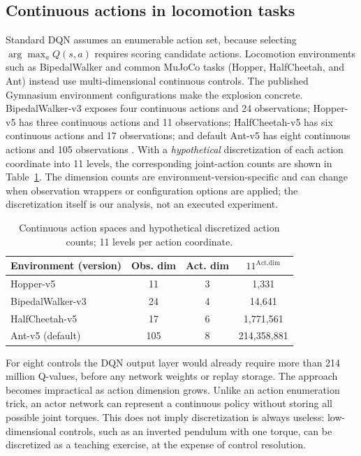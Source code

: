 \documentclass[conference,10pt]{IEEEtran}
\begin{document}
\subsection{Continuous actions in locomotion tasks}
Standard DQN assumes an enumerable action set, because selecting $\arg\max_a Q(s,a)$ requires scoring candidate actions. Locomotion environments such as BipedalWalker and common MuJoCo tasks (Hopper, HalfCheetah, and Ant) instead use multi-dimensional continuous controls. The published Gymnasium environment configurations make the explosion concrete. BipedalWalker-v3 exposes four continuous actions and 24 observations; Hopper-v5 has three continuous actions and 11 observations; HalfCheetah-v5 has six continuous actions and 17 observations; and default Ant-v5 has eight continuous actions and 105 observations \cite{GymnasiumDocs}. With a \emph{hypothetical} discretization of each action coordinate into 11 levels, the corresponding joint-action counts are shown in Table~\ref{tab:continuous}. The dimension counts are environment-version-specific and can change when observation wrappers or configuration options are applied; the discretization itself is our analysis, not an executed experiment.

\begin{table}[t]
\caption{Continuous action spaces and hypothetical discretized action counts; 11 levels per action coordinate.}
\label{tab:continuous}
\centering\footnotesize\setlength{\tabcolsep}{4pt}
\begin{tabular}{lccc}
\toprule
Environment (version) & Obs. dim & Act. dim & $11^{\mathrm{Act. dim}}$ \\
\midrule
Hopper-v5 & 11 & 3 & 1,331 \\
BipedalWalker-v3 & 24 & 4 & 14,641 \\
HalfCheetah-v5 & 17 & 6 & 1,771,561 \\
Ant-v5 (default) & 105 & 8 & 214,358,881 \\
\bottomrule
\end{tabular}
\end{table}

For eight controls the DQN output layer would already require more than 214 million Q-values, before any network weights or replay storage. The approach becomes impractical as action dimension grows. Unlike an action enumeration trick, an actor network can represent a continuous policy without storing all possible joint torques. This does not imply discretization is always useless: low-dimensional controls, such as an inverted pendulum with one torque, can be discretized as a teaching exercise, at the expense of control resolution.
\end{document}
